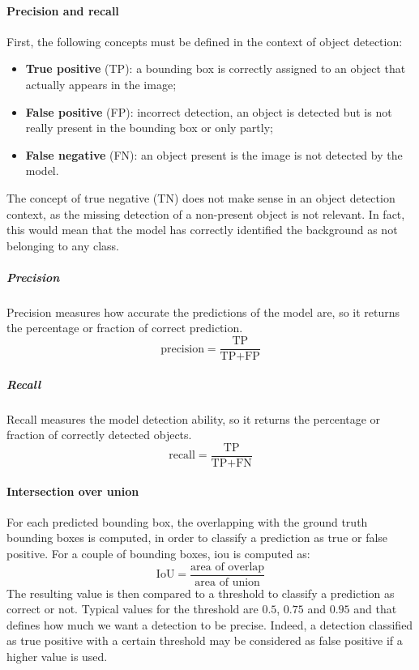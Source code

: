\documentclass[%
    corpo=12pt,
    twoside,
    stile=classica,   
    tipotesi=magistrale,
    evenboxes,
    english,
	numerazioneromana,
]{toptesi}
\begin{document}
\paragraph{Precision and recall}
First, the following concepts must be defined in the context of object detection:
\begin{itemize}
	\item \textbf{True positive} (TP): a bounding box is correctly assigned to an object that actually appears in the image;
	\item \textbf{False positive} (FP): incorrect detection, an object is detected but is not really present in the bounding box or only partly;
	\item \textbf{False negative} (FN): an object present is the image is not detected by the model.
\end{itemize}
The concept of true negative (TN) does not make sense in an object detection context, as the missing detection of a non-present object is not relevant. In fact, this would mean that the model has correctly identified the background as not belonging to any class.

\subparagraph{Precision}
Precision measures how accurate the predictions of the model are, so it returns the percentage or fraction of correct prediction.
\begin{equation}
	\text{precision} = \frac{\text{TP}}{\text{TP}+\text{FP}}
\end{equation}

\subparagraph{Recall}
Recall measures the model detection ability, so it returns the percentage or fraction of correctly detected objects.
\begin{equation}
	\text{recall} = \frac{\text{TP}}{\text{TP}+\text{FN}}
\end{equation}

\paragraph{Intersection over union}
For each predicted bounding box, the overlapping with the ground truth bounding boxes is computed, in order to classify a prediction as true or false positive. For a couple of bounding boxes, \gls{iou} is computed as:
\begin{equation}
	\text{IoU} = \frac{\text{area of overlap}}{\text{area of union}}
\end{equation}
The resulting value is then compared to a threshold to classify a prediction as correct or not. Typical values for the threshold are $0.5$, $0.75$ and $0.95$ and that defines how much we want a detection to be precise. Indeed, a detection classified as true positive with a certain threshold may be considered as false positive if a higher value is used.
\end{document}
